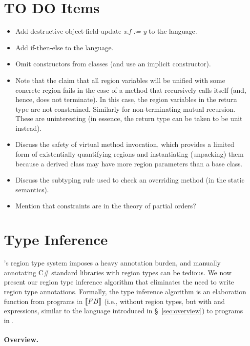 \section{TO DO Items}

\begin{itemize}
\item Add destructive object-field-update \emph{x.f := y} to the language.
\item Add if-then-else to the language.
\item Omit constructors from classes (and use an implicit constructor).
\item Note that the claim that all region variables will be unified with some concrete
region fails in the case of a method that recursively calls itself (and, hence, does not
terminate). In this case, the region variables in the return type are not constrained.
Similarly for non-terminating mutual recursion. These are uninteresting (in essence, the
return type can be taken to be unit instead).
\item Discuss the safety of virtual method invocation, which provides a limited form
of existentially quantifying regions and instantiating (unpacking) them because a
derived class may have more region parameters than a base class.
\item Discuss the subtyping rule used to check an overriding method (in the static
semantics).
\item Mention that constraints are in the theory of partial orders?
\end{itemize}

\section{Type Inference}
\label{sec:type-inference}

\name's region type system imposes a heavy annotation burden, and
manually annotating C\# standard libraries with region types
can be tedious. We now present our region type inference algorithm
that eliminates the need to write region type annotations.
Formally, the type inference
algorithm is an elaboration function from programs in $\llbracket {\sc FB} \rrbracket$
(i.e., \FB without region types, but with  and 
expressions, similar to the language introduced in
\S~\ref{sec:overview}) to programs in \FB.

\paragraph{Overview.}

